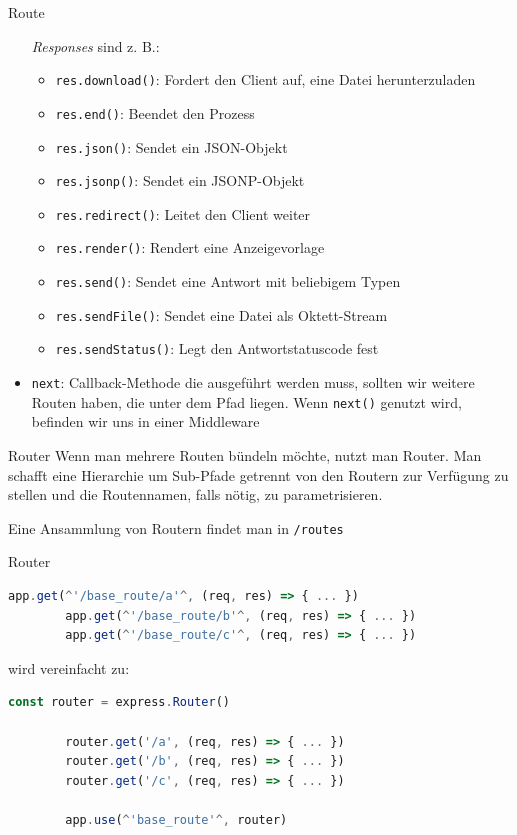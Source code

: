 \begin{defi}{Route}
\begin{itemize}
              \emph{Responses} sind z. B.:
              \begin{itemize}
                  \item \texttt{res.download()}: Fordert den Client auf, eine Datei herunterzuladen
                  \item \texttt{res.end()}: Beendet den Prozess
                  \item \texttt{res.json()}: Sendet ein JSON-Objekt
                  \item \texttt{res.jsonp()}: Sendet ein JSONP-Objekt
                  \item \texttt{res.redirect()}: Leitet den Client weiter
                  \item \texttt{res.render()}: Rendert eine Anzeigevorlage
                  \item \texttt{res.send()}: Sendet eine Antwort mit beliebigem Typen
                  \item \texttt{res.sendFile()}: Sendet eine Datei als Oktett-Stream
                  \item \texttt{res.sendStatus()}: Legt den Antwortstatuscode fest
              \end{itemize}
        \item \texttt{next}: Callback-Methode die ausgeführt werden muss, sollten wir weitere Routen haben, die unter dem Pfad liegen.
              Wenn \texttt{next()} genutzt wird, befinden wir uns in einer Middleware
    \end{itemize}
\end{defi}

\begin{defi}{Router}
    Wenn man mehrere Routen bündeln möchte, nutzt man Router.
    Man schafft eine Hierarchie um Sub-Pfade getrennt von den Routern zur Verfügung zu stellen und die Routennamen, falls nötig, zu parametrisieren.

    Eine Ansammlung von Routern findet man in \texttt{/routes}
\end{defi}

\begin{example}{Router}
    \begin{lstlisting}[language=JavaScript]
        app.get(^'/base_route/a'^, (req, res) => { ... })
        app.get(^'/base_route/b'^, (req, res) => { ... })
        app.get(^'/base_route/c'^, (req, res) => { ... })
    \end{lstlisting}

    wird vereinfacht zu:

    \begin{lstlisting}[language=JavaScript]
        const router = express.Router()

        router.get('/a', (req, res) => { ... })
        router.get('/b', (req, res) => { ... })
        router.get('/c', (req, res) => { ... })

        app.use(^'base_route'^, router)
    \end{lstlisting}
\end{example}

